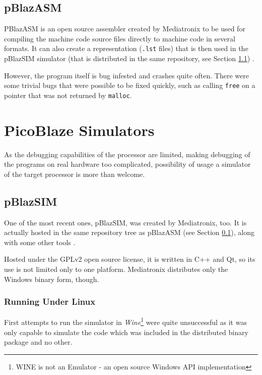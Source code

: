         \subsection{pBlazASM}\label{pblazasm}

        PBlazASM is an open source assembler created by Mediatronix to be used for compiling the machine code source files directly to machine code in several formats. It can also create a representation (\texttt{.lst} files) that is then used in the pBlazSIM simulator (that is distributed in the same repository, see Section \ref{pblazsim}) \cite{PblazAsm}.

        However, the program itself is bug infested and crashes quite often. There were some trivial bugs that were possible to be fixed quickly, such as calling \texttt{free} on a pointer that was not returned by \texttt{malloc}.

    \section{PicoBlaze Simulators}

        As the debugging capabilities of the processor are limited, making debugging of the programs on real hardware too complicated, possibility of usage a simulator of the target processor is more than welcome.

        \subsection{pBlazSIM}\label{pblazsim}

        One of the most recent ones, pBlazSIM, was created by Mediatronix, too. It is actually hosted in the same repository tree as pBlazASM (see Section \ref{pblazasm}), along with some other tools \cite{PblazSim}. \cite{PblazAsmRepo}

        Hosted under the GPLv2 open source license, it is written in C++ and Qt, so its use is not limited only to one platform. Mediatronix distributes only the Windows binary form, though.

            \subsubsection{Running Under Linux}

            First attempts to run the simulator in \emph{Wine}\footnote{WINE is not an Emulator - an open source Windows API implementation} were quite unsuccessful as it was only capable to simulate the code which was included in the distributed binary package and no other.

